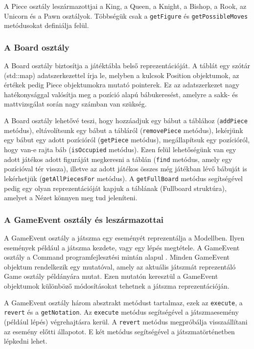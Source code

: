 \documentclass[12pt, twoside]{report}
\begin{document}
A Piece osztály leszármazottjai a King, a Queen, a Knight, a Bishop, a Rook, az Unicorn és a Pawn osztályok. Többségük csak a {\tt getFigure} és {\tt getPossibleMoves} metódusokat definiálja felül.

\subsubsection{A Board osztály}

A Board osztály biztosítja a játéktábla belső reprezentációját. A táblát egy szótár (std::map) adatszerkezettel írja le, melyben a kulcsok Position objektumok, az értékek pedig Piece objektumokra mutató pointerek. Ez az adatszerkezet nagy hatékonysággal valósítja meg a pozíció alapú bábukeresést, amelyre a sakk- és mattvizsgálat során nagy számban van szükség.

A Board osztály lehetővé teszi, hogy hozzáadjuk egy bábut a táblához ({\tt addPiece} metódus), eltávolítsunk egy bábut a tábláról ({\tt removePiece} metódus), lekérjünk egy bábut egy adott pozícióról ({\tt getPiece} metódus), megállapítsuk egy pozícióról, hogy van-e rajta báb ({\tt isOccupied} metódus). Ezen felül lehetőségünk van egy adott játékos adott figuráját megkeresni a táblán ({\tt find} metódus, amely egy pozícióval tér vissza), illetve az adott játékos összes még játékban lévő bábuját is lekérhetjük ({\tt getAllPiecesFor} metódus). A {\tt getFullBoard} metódus segítségével pedig egy olyan reprezentációját kapjuk a táblának (Fullboard struktúra), amelyet a Nézet könnyen meg tud jeleníteni.

\subsubsection{A GameEvent osztály és leszármazottai}

A GameEvent osztály a játszma egy eseményét reprezentálja a Modellben. Ilyen események például a játszma kezdete, vagy egy lépés megtétele. A GameEvent osztály a Command programfejlesztési mintán alapul \cite{designpatterns}. Minden GameEvent objektum rendelkezik egy mutatóval, amely az aktuális játszmát reprezentáló Game osztály példányára mutat. Ezen mutatón keresztül a GameEvent objektumok különböző módosításokat tehetnek a játszma reprezentációján.

A GameEvent osztály három absztrakt metódust tartalmaz, ezek az {\tt execute}, a {\tt revert} és a {\tt getNotation}. Az {\tt execute} metódus segítségével a játszmaesemény (például lépés) végrehajtásra kerül. A {\tt revert} metódus megpróbálja visszaállítani az esemény előtti állapotot. E két metódus segítségével a játsz\-ma\-tör\-té\-net\-ben lépkedni lehet.
\end{document}
